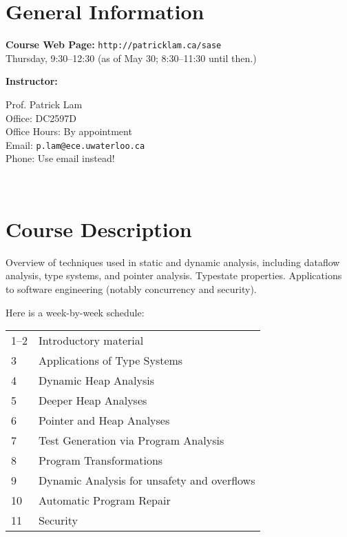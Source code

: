 \documentclass{article}
\begin{document}
\section*{General Information}

\noindent
{\bf Course Web Page:} {\tt http://patricklam.ca/sase}\\[0.5em]
 Thursday, 9:30--12:30 (as of May 30; 8:30--11:30 until then.)

\vspace*{1em}\noindent
{\bf Instructor:} \\

\noindent
\hspace*{2em} \begin{minipage}{.6\textwidth}
Prof. Patrick Lam\\
Office: DC2597D\\
Office Hours: By appointment\\
Email: {\tt p.lam@ece.uwaterloo.ca}\\
Phone: Use email instead!

\end{minipage} \\[1em]


\section*{Course Description}
Overview of techniques used in static and dynamic analysis, including
dataflow analysis, type systems, and pointer analysis. Typestate
properties. Applications to software engineering (notably concurrency
and security).

Here is a week-by-week schedule:

\begin{tabular}{ll}
1--2 & Introductory material \\
3 & Applications of Type Systems \\
4 & Dynamic Heap Analysis \\
5 & Deeper Heap Analyses \\
6 & Pointer and Heap Analyses \\
7 & Test Generation via Program Analysis \\
8 & Program Transformations \\
9 & Dynamic Analysis for unsafety and overflows \\
10 & Automatic Program Repair \\
11 & Security
\end{tabular}
\end{document}
